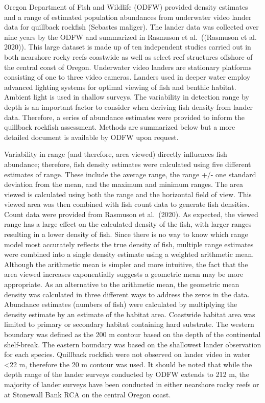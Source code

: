 \documentclass[11pt,
  english,
  a4paper,
]{article}
\begin{document}
Oregon Department of Fish and Wildlife (ODFW) provided density estimates and a range of estimated population abundances from underwater video lander data for quillback rockfish (Sebastes maliger). The lander data was collected over nine years by the ODFW and summarized in Rasmuson et al.~({(Rasmuson et al. 2020)\leavevmode\tagmcend\tagstructend}). This large dataset is made up of ten independent studies carried out in both nearshore rocky reefs coastwide as well as select reef structures offshore of the central coast of Oregon. Underwater video landers are stationary platforms consisting of one to three video cameras. Landers used in deeper water employ advanced lighting systems for optimal viewing of fish and benthic habitat. Ambient light is used in shallow surveys. The variability in detection range by depth is an important factor to consider when deriving fish density from lander data. Therefore, a series of abundance estimates were provided to inform the quillback rockfish assessment. Methods are summarized below but a more detailed document is available by ODFW upon request.

\leavevmode\tagmcend\tagstructend\par


Variability in range (and therefore, area viewed) directly influences fish abundance; therefore, fish density estimates were calculated using five different estimates of range. These include the average range, the range +/- one standard deviation from the mean, and the maximum and minimum ranges. The area viewed is calculated using both the range and the horizontal field of view. This viewed area was then combined with fish count data to generate fish densities. Count data were provided from Rasmuson et al.~(2020). As expected, the viewed range has a large effect on the calculated density of the fish, with larger ranges resulting in a lower density of fish. Since there is no way to know which range model most accurately reflects the true density of fish, multiple range estimates were combined into a single density estimate using a weighted arithmetic mean. Although the arithmetic mean is simpler and more intuitive, the fact that the area viewed increases exponentially suggests a geometric mean may be more appropriate. As an alternative to the arithmetic mean, the geometric mean density was calculated in three different ways to address the zeros in the data. Abundance estimates (numbers of fish) were calculated by multiplying the density estimate by an estimate of the habitat area. Coastwide habitat area was limited to primary or secondary habitat containing hard substrate. The western boundary was defined as the 200 m contour based on the depth of the continental shelf-break. The eastern boundary was based on the shallowest lander observation for each species. Quillback rockfish were not observed on lander video in water \textless22 m, therefore the 20 m contour was used. It should be noted that while the depth range of the lander surveys conducted by ODFW extends to 212 m, the majority of lander surveys have been conducted in either nearshore rocky reefs or at Stonewall Bank RCA on the central Oregon coast.
\end{document}
